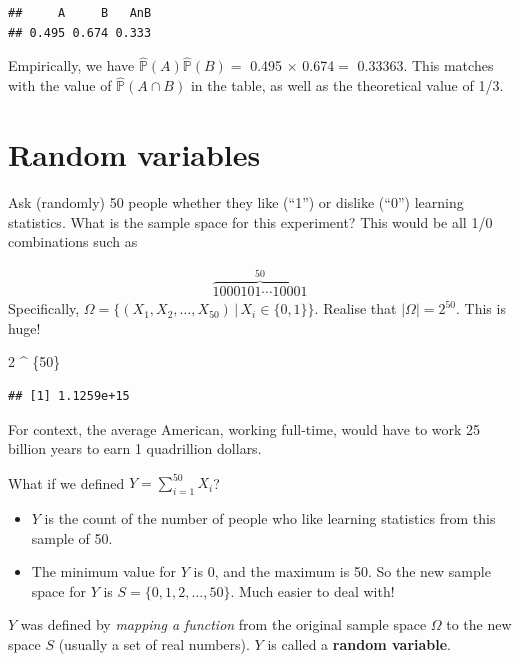 \documentclass[
]{book}
\newenvironment{Shaded}{\begin{snugshade}}{\end{snugshade}}
\newcommand{\DecValTok}[1]{\textcolor[rgb]{0.00,0.00,0.81}{#1}}
\newcommand{\NormalTok}[1]{#1}
\newcommand{\SpecialCharTok}[1]{\textcolor[rgb]{0.00,0.00,0.00}{#1}}
\providecommand{\tightlist}{%
  \setlength{\itemsep}{0pt}\setlength{\parskip}{0pt}}
\newcommand{\bbP}{\mathbb{P}}
\theoremstyle{definition}
\theoremstyle{definition}
\theoremstyle{definition}
\theoremstyle{definition}
\theoremstyle{remark}
\begin{document}
\begin{verbatim}
##     A     B   AnB 
## 0.495 0.674 0.333
\end{verbatim}

Empirically, we have \(\hat{\bbP}(A)\hat{\bbP}(B) =\) 0.495 \(\times\) 0.674\(=\) 0.33363.
This matches with the value of \(\hat{\bbP}(A \cap B)\) in the table, as well as the theoretical value of 1/3.

\hypertarget{random-variables}{%
\section{Random variables}\label{random-variables}}

Ask (randomly) 50 people whether they like (``1'') or dislike (``0'') learning statistics.
What is the sample space for this experiment?
This would be all 1/0 combinations such as

\begin{align*}
\overbrace{1000101\cdots 10001}^{50}
\end{align*}
Specifically, \(\Omega = \big\{(X_1,X_2,\dots,X_{50}) \,|\, X_i \in \{0,1\} \big\}\). Realise that \(|\Omega| = 2^{50}\). This is huge!

\begin{Shaded}
\begin{Highlighting}[]
\DecValTok{2} \SpecialCharTok{\^{}}\NormalTok{ \{}\DecValTok{50}\NormalTok{\}}
\end{Highlighting}
\end{Shaded}

\begin{verbatim}
## [1] 1.1259e+15
\end{verbatim}

For context, the average American, working full-time, would have to work 25 billion years to earn 1 quadrillion dollars.

What if we defined \(Y = \sum_{i=1}^{50} X_i\)?

\begin{itemize}
\tightlist
\item
  \(Y\) is the count of the number of people who like learning statistics from this sample of 50.
\item
  The minimum value for \(Y\) is 0, and the maximum is 50. So the new sample space for \(Y\) is \(S = \{0,1,2,\dots,50\}\). Much easier to deal with!
\end{itemize}

\(Y\) was defined by \emph{mapping a function} from the original sample space \(\Omega\) to the new space \(S\) (usually a set of real numbers).
\(Y\) is called a \textbf{random variable}.
\end{document}
